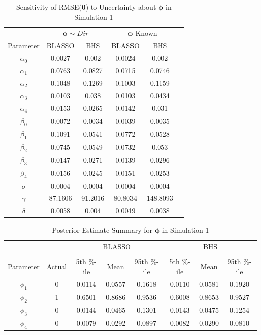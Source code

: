 \begin{table}[!h]
	\footnotesize
  \centering
  \caption{Sensitivity of RMSE($\bm{\theta}$) to Uncertainty about $\bm{\phi}$ in Simulation 1}
    \begin{tabular}{cccccc}
    \toprule
    & \multicolumn{2}{c}{$\bm{\phi} \sim Dir$} & \multicolumn{2}{c}{$\bm{\phi}$ Known}\\
    \cline{2-3} \cline{4-5}
     Parameter & BLASSO & BHS & BLASSO & BHS  \\
    \midrule
    $\alpha_0$    & 0.0027 & 0.002 & 0.0024 & 0.002 \\
  $\alpha_1$  & 0.0763 & 0.0827 & 0.0715 & 0.0746 \\
    $\alpha_2$ & 0.1048 & 0.1269 & 0.1003 & 0.1159 \\
    $\alpha_3$    & 0.0103 & 0.038 & 0.0103 & 0.0434 \\
    $\alpha_4$    & 0.0153 & 0.0265 & 0.0142 & 0.031 \\
   $\beta_0$ & 0.0072 & 0.0034 & 0.0039 & 0.0035 \\
    $\beta_1$  & 0.1091 & 0.0541 & 0.0772 & 0.0528 \\
    $\beta_2$   & 0.0745 & 0.0549 & 0.0732 & 0.053 \\
   $\beta_3$     & 0.0147 & 0.0271 & 0.0139 & 0.0296 \\
    $\beta_4$    & 0.0156 & 0.0245 & 0.0151 & 0.0253 \\
   $\sigma$ & 0.0004 & 0.0004 & 0.0004 & 0.0004 \\
    $\gamma$  & 87.1606 & 91.2016 & 80.8034 & 148.8093 \\
    $\delta$ & 0.0058 & 0.004 & 0.0049 & 0.0038 \\
    \bottomrule
    \end{tabular}%
  \label{tab:rmsedirichlet}%
\end{table}%


\begin{table}[!h]
	\footnotesize
  \centering
  \caption{Posterior Estimate Summary for $\bm{\phi}$ in Simulation 1}
    \begin{tabular}{cccccccc}
    \toprule
    & & \multicolumn{3}{c}{BLASSO} & \multicolumn{3}{c}{ BHS} \\
    \cline{3-5} \cline{6-8}\\
   Parameter & Actual & 5th \%-ile   & Mean & 95th \%-ile   & 5th \%-ile   & Mean & 95th \%-ile \\
    \midrule
    $\phi_1$    & 0    & 0.0114 & 0.0557 & 0.1618 & 0.0110 & 0.0581 & 0.1920 \\
    $\phi_2$    & 1    & 0.6501 & 0.8686 & 0.9536 & 0.6008 & 0.8653 & 0.9527 \\
   $\phi_3$    & 0    & 0.0144 & 0.0465 & 0.1301 & 0.0143 & 0.0475 & 0.1254 \\
   $\phi_4$    & 0    & 0.0079 & 0.0292 & 0.0897 & 0.0082 & 0.0290 & 0.0810 \\
    \bottomrule
    \end{tabular}%
  \label{tab:estdirichlet}%
\end{table}%


